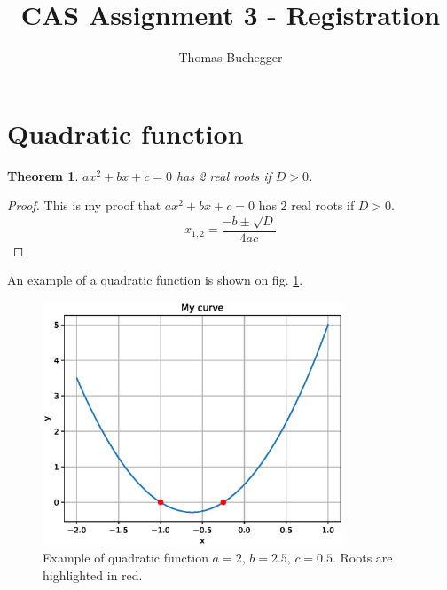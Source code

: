 \documentclass[12pt]{article}
\begin{document}


\title{CAS Assignment 3 - Registration}%
\author{Thomas Buchegger}

\maketitle

\section{Quadratic function}
\newtheorem{thm}{Theorem}
\begin{thm}
$ax^2+bx+c=0$ has 2 real roots if $D>0$.
\end{thm}

\begin{proof}
This is my proof that $ax^2+bx+c=0$ has 2 real roots if $D>0$.
\[
x_{1,2}=\frac{-b\pm\sqrt{D}}{4ac}
\]
\end{proof}

An example of a quadratic function is shown on fig. \ref{fig:q1}.

\begin{figure}
\centering
\includegraphics[width=0.8\textwidth]{pics/q1}
\caption{Example of quadratic function $a=2$, $b=2.5$, $c=0.5$. Roots are highlighted in red.}
\label{fig:q1}
\end{figure}
\end{document}
